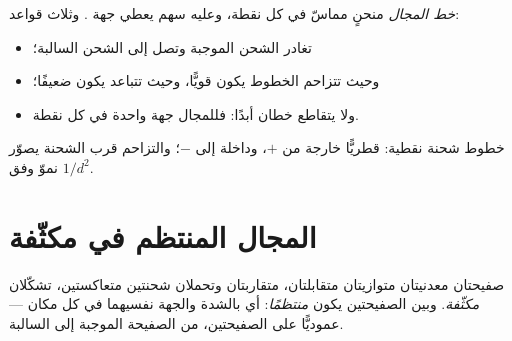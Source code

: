 \begin{definition}\label{def:g11:electric-gravitational-fields:lines}
\emph{خط المجال} منحنٍ مماسّ  في كل
نقطة، وعليه سهم يعطي جهة . وثلاث قواعد:
\begin{itemize}
  \item تغادر الشحن الموجبة وتصل إلى الشحن السالبة؛
  \item وحيث تتزاحم الخطوط يكون  قويًّا، وحيث تتباعد يكون ضعيفًا؛
  \item ولا يتقاطع خطان أبدًا: فللمجال جهة واحدة في كل نقطة.
\end{itemize}
\end{definition}

\begin{omfigure}
\qquad\qquad
{}

{\small خطوط  شحنة نقطية: قطريًّا خارجة من $+$، وداخلة إلى $-$؛
والتزاحم قرب الشحنة يصوّر نموّ  وفق $1/d^2$.}
\end{omfigure}

\section{المجال المنتظم في مكثّفة}

\begin{definition}\label{def:g11:electric-gravitational-fields:capacitor}
صفيحتان معدنيتان متوازيتان متقابلتان، متقاربتان وتحملان شحنتين
متعاكستين، تشكّلان \emph{مكثّفة}. وبين الصفيحتين
يكون  \emph{منتظمًا}: أي بالشدة والجهة
نفسيهما في كل مكان --- عموديًّا على الصفيحتين، من الصفيحة الموجبة
إلى السالبة.
\end{definition}

